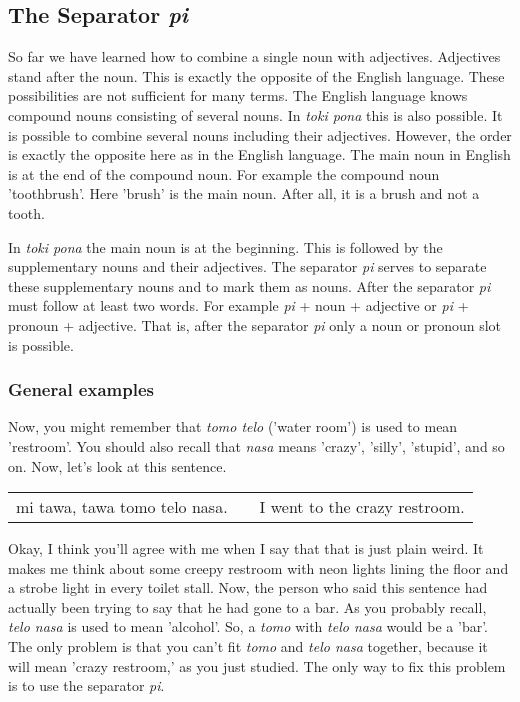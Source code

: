 \subsection*{The Separator \textit{pi}}
%

So far we have learned how to combine a single noun with adjectives.
Adjectives stand after the noun.
This is exactly the opposite of the English language.
These possibilities are not sufficient for many terms.
The English language knows compound nouns consisting of several nouns.
In \textit{toki pona} this is also possible.
It is possible to combine several nouns including their adjectives.
However, the order is exactly the opposite here as in the English language.
The main noun in English is at the end of the compound noun.
For example the compound noun 'toothbrush'. Here 'brush' is the main noun.
After all, it is a brush and not a tooth.

In \textit{toki pona} the main noun is at the beginning.
This is followed by the supplementary nouns and their adjectives.
The separator \textit{pi} serves to separate these supplementary nouns and to mark them as nouns.
After the separator \textit{pi} must follow at least two words.
For example \textit{pi} + noun + adjective or \textit{pi} + pronoun + adjective.
That is, after the separator \textit{pi} only a noun or pronoun slot is possible.

%
\subsubsection*{General examples}
%
Now, you might remember that \textit{tomo telo} ('water room') is used to mean 'restroom'.
You should also recall that \textit{nasa} means 'crazy', 'silly', 'stupid', and so on.
Now, let's look at this sentence.

\begin{supertabular}{p{5,5cm}|ll}
    mi tawa, tawa tomo telo nasa. &  & I went to the crazy restroom. \\ %
\end{supertabular}

Okay, I think you'll agree with me when I say that that is just plain weird.
It makes me think about some creepy restroom with neon lights lining the floor and a strobe light in every toilet stall.
Now, the person who said this sentence had actually been trying to say that he had gone to a bar.
As you probably recall, \textit{telo nasa} is used to mean 'alcohol'.
So, a \textit{tomo} with \textit{telo nasa} would be a 'bar'.
The only problem is that you can't fit \textit{tomo} and \textit{telo nasa} together, because it will mean 'crazy restroom,' as you just studied.
The only way to fix this problem is to use the separator \textit{pi}.

